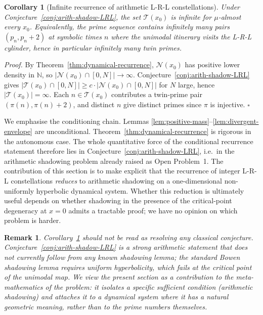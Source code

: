 \documentclass[cupthm,crop,info]{CUP-JNL-ETS}
\theoremstyle{cupplain}
\newtheorem{corollary}[theorem]{Corollary}
\theoremstyle{cupdefinition}
\theoremstyle{cupremark}
\newtheorem{remark}[theorem]{Remark}
\providecommand{\qed}{\hfill\(\square\)}
\newenvironment{proof}{\par\noindent\textit{Proof.}\quad}{\qed\par\medskip}
\numberwithin{equation}{section}
\begin{document}
\begin{corollary}[Infinite recurrence of arithmetic L-R-L constellations]
\label{cor:twin-conditional}
Under Conjecture~\ref{conj:arith-shadow-LRL}, the set
$\mathcal{T}(x_0)$ is infinite for $\mu$-almost every $x_0$.
Equivalently, the prime sequence contains infinitely many pairs
$(p_n, p_n + 2)$ at symbolic times $n$ where the unimodal itinerary
visits the L-R-L cylinder, hence in particular infinitely many twin
primes.
\end{corollary}
\begin{proof}
By Theorem~\ref{thm:dynamical-recurrence}, $\mathcal{N}(x_0)$ has
positive lower density in $\mathbb{N}$, so
$|\mathcal{N}(x_0) \cap [0, N]| \to \infty$. Conjecture~\ref{conj:arith-shadow-LRL}
gives $|\mathcal{T}(x_0) \cap [0, N]| \geq c \cdot |\mathcal{N}(x_0) \cap [0, N]|$
for $N$ large, hence $|\mathcal{T}(x_0)| = \infty$. Each $n \in \mathcal{T}(x_0)$
contributes a twin-prime pair $(\pi(n), \pi(n)+2)$, and distinct $n$
give distinct primes since $\pi$ is injective.
\end{proof}

We emphasise the conditioning chain. Lemmas
\ref{lem:positive-mass}--\ref{lem:divergent-envelope} are
unconditional. Theorem~\ref{thm:dynamical-recurrence} is rigorous
in the autonomous case. The whole quantitative force of the
conditional recurrence statement therefore lies in
Conjecture~\ref{conj:arith-shadow-LRL}, i.e.\ in the arithmetic
shadowing problem already raised as Open Problem~1. The contribution
of this section is to make explicit that the recurrence of integer
L-R-L constellations \emph{reduces} to arithmetic shadowing on a
one-dimensional non-uniformly hyperbolic dynamical system. Whether
this reduction is ultimately useful depends on whether shadowing in
the presence of the critical-point degeneracy at $x = 0$ admits a
tractable proof; we have no opinion on which problem is harder.

\begin{remark}
\label{rem:over-claim}
Corollary~\ref{cor:twin-conditional} should not be read as resolving
any classical conjecture. Conjecture~\ref{conj:arith-shadow-LRL} is a
strong arithmetic statement that does not currently follow from any
known shadowing lemma; the standard Bowen shadowing lemma requires
uniform hyperbolicity, which fails at the critical point of the
unimodal map. We view the present section as a contribution to the
meta-mathematics of the problem: it isolates a specific sufficient
condition (arithmetic shadowing) and attaches it to a dynamical
system where it has a natural geometric meaning, rather than to the
prime numbers themselves.
\end{remark}
\end{document}

